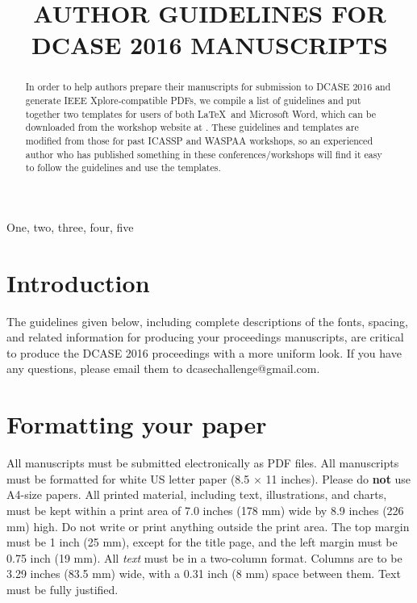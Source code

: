 \documentclass{article}
\title{AUTHOR GUIDELINES FOR DCASE 2016 MANUSCRIPTS}
\begin{document}
\ninept
\maketitle

\begin{sloppy}

\begin{abstract}
  In order to help authors prepare their manuscripts for 
  submission to DCASE 2016 and generate IEEE Xplore-compatible 
  PDFs, we compile a list of guidelines and put together two
  templates for users of both \LaTeX\ and Microsoft Word, which
  can be downloaded from the workshop website at \cite{dcase2016web}.
  These guidelines and templates are modified from those for past
  ICASSP and WASPAA workshops, so an experienced author who 
  has published something in these conferences/workshops will 
  find it easy to follow the guidelines and use the templates.
\end{abstract}

\begin{keywords}
One, two, three, four, five
\end{keywords}

\section{Introduction}
\label{sec:intro}

The guidelines given below, including complete descriptions of 
the fonts, spacing, and related information for producing your 
proceedings manuscripts, are critical to produce the DCASE 2016 
proceedings with a more uniform look.
If you have any questions, please email them to dcasechallenge@gmail.com.

\section{Formatting your paper}
\label{sec:format}

All manuscripts must be submitted electronically as PDF files. 
All manuscripts must be formatted for white US letter paper 
(8.5 $\times$ 11 inches). Please do {\bf not} use A4-size papers. 
All printed material, including text, illustrations, and charts, 
must be kept within a print area of 7.0 inches (178 mm) wide 
by 8.9 inches (226 mm) high. Do not write or print anything outside 
the print area. The top margin must be 1 inch (25 mm), except for 
the title page, and the left margin must be 0.75 inch (19 mm).  
All {\it text} must be in a two-column format. Columns are to be 
3.29 inches (83.5 mm) wide, with a 0.31 inch (8 mm) space between 
them. Text must be fully justified. 



\end{sloppy}
\end{document}
